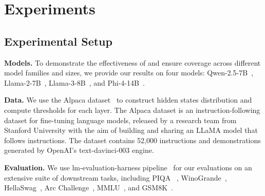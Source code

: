 \section{Experiments}
\label{sec:experiments}

\subsection{Experimental Setup}
\label{sec:experimental_setup} 
\textbf{Models.} To demonstrate the effectiveness of \algacro{} and ensure coverage across different model families and sizes, we provide our results on four models: Qwen-2.5-7B~\citep{qwen2024qwen25}, Llama-2-7B~\citep{touvron2023llama}, Llama-3-8B~\citep{dubey2024llama}, and Phi-4-14B~\citep{abdin2024phi}.

\textbf{Data.} We use the Alpaca dataset~\citep{taori2023alpaca} to construct hidden states distribution and compute thresholds for each layer. The Alpaca dataset is an instruction-following dataset for fine-tuning language models, released by a research team from Stanford University with the aim of building and sharing an LLaMA model that follows instructions. The dataset contains 52,000 instructions and demonstrations generated by OpenAI’s text-davinci-003 engine. 

\textbf{Evaluation.}
We use lm-evaluation-harness pipeline~\citep{eval-harness} for our evaluations on an extensive suite of downstream tasks, including PIQA ~\citep{bisk2020piqa},  WinoGrande~\citep{sakaguchi2019winogrande}, HellaSwag~\citep{zellers2019hellaswag}, Arc Challenge~\citep{allenai:arc}, MMLU~\citep{hendrycks2020measuring}, and GSM8K~\citep{cobbe2021training}. 

